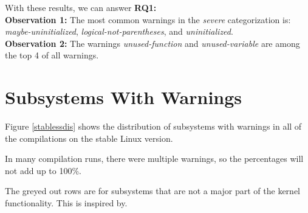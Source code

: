 \documentclass[a4paper,11pt]{report}
\begin{document}
With these results, we can answer \textbf{RQ1:} 
\\

\textbf{Observation 1:}
The most common warnings in the \emph{severe} categorization is: 
\emph{maybe-uninitialized}, \emph{logical-not-parentheses}, and 
\emph{uninitialized}.
\\

\textbf{Observation 2:}
The warnings \emph{unused-function} and \emph{unused-variable} are among the 
top 4 of all warnings.









            \section{Subsystems With Warnings}
Figure \ref{stablessdis} shows the distribution of subsystems with warnings in 
all of the compilations on the stable Linux version.

In many compilation runs, there were multiple warnings, so the percentages will 
not add up to 100\%.

The greyed out rows are for subsystems that are not a major part of the kernel 
functionality. This is inspired by\cite{42bugs}.
\\
\end{document}
